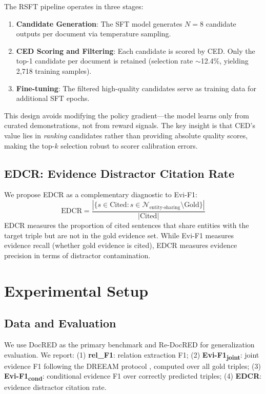 \documentclass[11pt]{article}
\begin{document}
The RSFT pipeline operates in three stages:
\begin{enumerate}
\item \textbf{Candidate Generation}: The SFT model generates $N{=}8$ candidate outputs per document via temperature sampling.
\item \textbf{CED Scoring and Filtering}: Each candidate is scored by CED. Only the top-1 candidate per document is retained (selection rate ${\sim}$12.4\%, yielding 2,718 training samples).
\item \textbf{Fine-tuning}: The filtered high-quality candidates serve as training data for additional SFT epochs.
\end{enumerate}

This design avoids modifying the policy gradient---the model learns only from curated demonstrations, not from reward signals. The key insight is that CED's value lies in \emph{ranking} candidates rather than providing absolute quality scores, making the top-$k$ selection robust to scorer calibration errors.

\subsection{EDCR: Evidence Distractor Citation Rate}

We propose EDCR as a complementary diagnostic to Evi-F1:
\begin{equation}
\text{EDCR} = \frac{|\{s \in \text{Cited} : s \in \mathcal{N}_{\text{entity-sharing}} \setminus \text{Gold}\}|}{|\text{Cited}|}
\end{equation}
EDCR measures the proportion of cited sentences that share entities with the target triple but are not in the gold evidence set. While Evi-F1 measures evidence recall (whether gold evidence is cited), EDCR measures evidence precision in terms of distractor contamination.

\section{Experimental Setup}

\subsection{Data and Evaluation}

We use DocRED \cite{yao2019docred} as the primary benchmark and Re-DocRED \cite{tan2022redocred} for generalization evaluation.
We report: (1) \textbf{rel\_F1}: relation extraction F1; (2) \textbf{Evi-F1\textsubscript{joint}}: joint evidence F1 following the DREEAM protocol \cite{ma2023dreeam}, computed over all gold triples; (3) \textbf{Evi-F1\textsubscript{cond}}: conditional evidence F1 over correctly predicted triples; (4) \textbf{EDCR}: evidence distractor citation rate.
\end{document}

